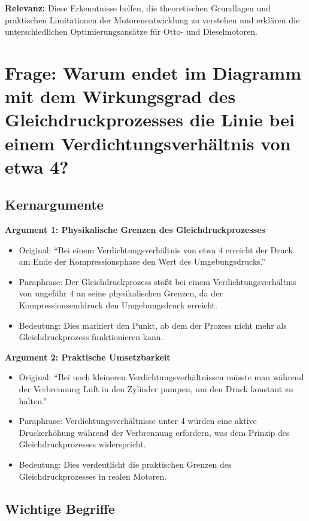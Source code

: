 \documentclass[a4paper,12pt]{article}
\begin{document}
\textbf{Relevanz:} Diese Erkenntnisse helfen, die theoretischen Grundlagen und praktischen Limitationen der Motorenentwicklung zu verstehen und erklären die unterschiedlichen Optimierungsansätze für Otto- und Dieselmotoren.



\section{Frage: Warum endet im Diagramm mit dem Wirkungsgrad des Gleichdruckprozesses die Linie bei einem Verdichtungsverhältnis von etwa 4?}

\subsection{Kernargumente}

\textbf{Argument 1: Physikalische Grenzen des Gleichdruckprozesses}

\begin{itemize}
    \item Original: \enquote{Bei einem Verdichtungsverhältnis von etwa 4 erreicht der Druck am Ende der Kompressionsphase den Wert des Umgebungsdrucks.}
    \item Paraphrase: Der Gleichdruckprozess stößt bei einem Verdichtungsverhältnis von ungefähr 4 an seine physikalischen Grenzen, da der Kompressionsenddruck den Umgebungsdruck erreicht.
    \item Bedeutung: Dies markiert den Punkt, ab dem der Prozess nicht mehr als Gleichdruckprozess funktionieren kann.
\end{itemize}

\textbf{Argument 2: Praktische Umsetzbarkeit}

\begin{itemize}
    \item Original: \enquote{Bei noch kleineren Verdichtungsverhältnissen müsste man während der Verbrennung Luft in den Zylinder pumpen, um den Druck konstant zu halten.}
    \item Paraphrase: Verdichtungsverhältnisse unter 4 würden eine aktive Druckerhöhung während der Verbrennung erfordern, was dem Prinzip des Gleichdruckprozesses widerspricht.
    \item Bedeutung: Dies verdeutlicht die praktischen Grenzen des Gleichdruckprozesses in realen Motoren.
\end{itemize}

\subsection{Wichtige Begriffe}
\end{document}
